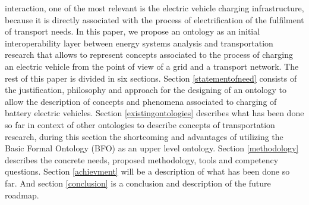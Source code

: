 interaction, one of the most relevant is the electric vehicle charging
infrastructure, because it is directly associated with the process of
electrification of the fulfilment of transport needs. In this paper, we propose
an ontology as an initial interoperability layer between energy systems
analysis and transportation research that allows to represent concepts
associated to the process of charging an electric vehicle from the point of
view of a grid and a transport network. The rest of this paper is divided in
six sections. Section \ref{statementofneed} consists of the justification,
philosophy and approach for the designing of an ontology to allow the
description of concepts and phenomena associated to charging of battery
electric vehicles. Section \ref{existingontologies} describes what has been
done so far in context of other ontologies to describe concepts of
transportation research, during this section the shortcoming and advantages of
utilizing the Basic Formal Ontology (BFO) \cite{Arp.2015} as an upper level
ontology. Section \ref{methodology} describes the concrete needs, proposed
methodology, tools and competency questions. Section \ref{achievment} will be a
description of what has been done so far. And section \ref{conclusion} is a
conclusion and description of the future roadmap.


